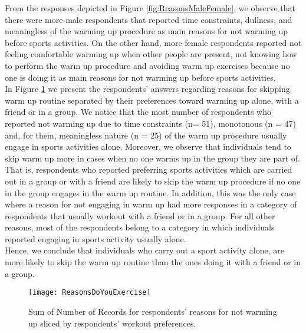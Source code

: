 From the responses depicted in Figure \ref{fig:ReasonsMaleFemale}, we observe that there were more male respondents that reported time constraints, dullness, and meaningless of the warming up procedure as main reasons for not warming up before sports activities. On the other hand, more female respondents reported not feeling comfortable warming up when other people are present, not knowing how to perform the warm up procedure and avoiding warm up exercises because no one is doing it as main reasons for not warming up before sports activities. \\In Figure  \ref{fig:ReasonsDoYouExercise} we present the respondents' answers regarding reasons for skipping warm up routine separated by their preferences toward warming up alone, with a friend or in a group. We notice that the most number of respondents who reported not warming up due to time constraints (n= 51), monotonous (n = 47) and, for them, meaningless nature (n = 25) of the warm up procedure usually engage in sports activities alone. Moreover, we observe that individuals tend to skip warm up more in cases when no one warms up in the group they are part of. That is, respondents who reported preferring sports activities which are carried out in a group or with a friend are likely to skip the warm up procedure if no one in the group engages in the warm up routine. In addition, this was the only case where a reason for not engaging in warm up had more responses in a category of respondents that usually workout with a friend or in a group. For all other reasons, most of the respondents belong to a category in which individuals reported engaging in sports activity usually alone. \\Hence, we conclude that individuals who carry out a sport activity alone, are more likely to skip the warm up routine than the ones doing it with a friend or in a group.\\
\begin{figure}[h]
    \centering
    \texttt{[image: ReasonsDoYouExercise]}
    \caption[Reasons for not warming up sliced by warm up preferences.]{Sum of Number of Records for respondents' reasons for not warming up sliced by respondents' workout preferences.}
    \label{fig:ReasonsDoYouExercise}
\end{figure}\\
